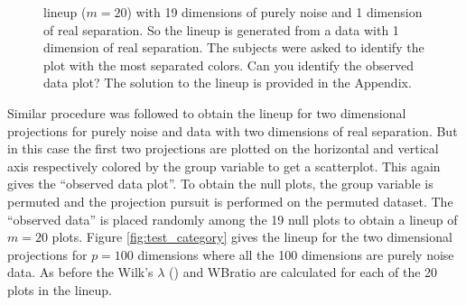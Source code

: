 \documentclass[12]{article}
\begin{document}
%
\begin{figure}[hbtp]
   \centering
       \caption{lineup  ($m=20$) with 19 dimensions of purely noise  and 1 dimension of real separation. So the lineup is generated from a data with 1 dimension of real separation. The subjects were asked to identify the plot with the most separated colors. Can you identify the observed data plot? The solution to the lineup is provided in the Appendix. }
     \label{fig:test_category_1d}
\end{figure}
%
%

Similar procedure was followed to obtain the lineup  for two dimensional projections for purely noise and data with two dimensions of real separation. But in this case the first two projections are plotted on the horizontal and vertical axis respectively colored by the group variable to get a scatterplot. This again gives the ``observed data plot''. To obtain the null plots, the group variable is permuted and the projection pursuit is performed on the permuted dataset. The ``observed data'' is placed randomly among the 19 null plots to obtain a lineup of $m = 20$ plots. Figure \ref{fig:test_category} gives the lineup  for the two dimensional projections for $p =100$ dimensions where all the 100 dimensions are purely noise data. As before the Wilk's $\lambda$ (\cite{JW02})  and WBratio are calculated for each of the 20 plots in the lineup. 
 
\end{document}
